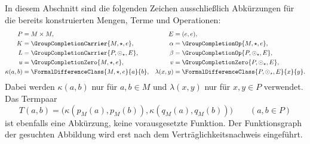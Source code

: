 In diesem Abschnitt sind die folgenden Zeichen ausschließlich
Abkürzungen für die bereits konstruierten Mengen, Terme und Operationen:
\[
\begin{aligned}
 P&=M\times M,& E&=(e,e),\\
 K&=\GroupCompletionCarrier{M,\star,e},&
 \alpha&=\GroupCompletionOp{M,\star,e},\\
 L&=\GroupCompletionCarrier{P,\odot_\star,E},&
 \beta&=\GroupCompletionOp{P,\odot_\star,E},\\
 u&=\GroupCompletionZero{M,\star,e},&
 v&=\GroupCompletionZero{P,\odot_\star,E},\\
 \kappa(a,b)&=\FormalDifferenceClass{M,\star,e}{a}{b},&
 \lambda(x,y)&=\FormalDifferenceClass{P,\odot_\star,E}{x}{y}.
\end{aligned}
\]
Dabei werden \(\kappa(a,b)\) nur für \(a,b\in M\) und
\(\lambda(x,y)\) nur für \(x,y\in P\) verwendet.
Das Termpaar
\[
 T(a,b)=\bigl(\kappa(p_M(a),p_M(b)),
                 \kappa(q_M(a),q_M(b))\bigr)
 \qquad(a,b\in P)
\]
ist ebenfalls eine Abkürzung, keine vorausgesetzte Funktion.
Der Funktionsgraph der gesuchten Abbildung wird erst nach dem
Verträglichkeitsnachweis eingeführt.

\hypertarget{differences.statement.FDProductCompletionStructures}{}
\begin{tabproofwide}
\end{tabproofwide}

